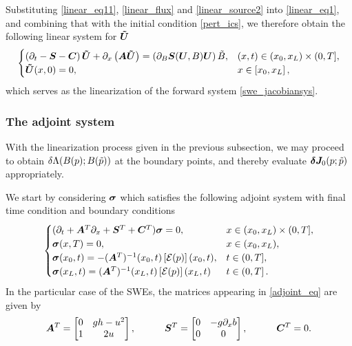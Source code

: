 Substituting \eqref{linear_eq11}, \eqref{linear_flux} and \eqref{linear_source2} into
\eqref{linear_eq1}, and combining that with the initial condition \eqref{pert_ics}, we therefore obtain the following linear system for $\bm{\tilde{U}}$
\begin{equation} \label{linear_eq2}
    \begin{cases}
    \left(\partial_t - \bm{S} -\bm{C} \right) \bm{\tilde{U}} +\partial_x\left(\bm{A}\bm{\tilde{U}}\right) = \left(\partial_{B}\bm{S}(\bm{U},B)\bm{U}\right){\tilde{B}},  & (x,t) \in (x_0,x_L) \times (0,T], \\
    \bm{\tilde{U}}(x,0) = 0, & x \in [x_0,x_L] \,, \\
    \end{cases}
\end{equation}
which serves as the linearization of the forward system \eqref{swe_jacobiansys}.


\subsubsection{The adjoint system}

With the linearization process given in the previous subsection, we may proceed to obtain $\delta\Lambda (B(p);B(\tilde{p}))$ at the boundary points, and thereby evaluate $\bm{\delta J}_0 (p;\tilde{p})$ appropriately.

We start by considering $\bm{\sigma}$ which satisfies the following adjoint system with final time condition and boundary conditions
\begin{equation} \label{adjoint_eq}
    \begin{cases}
    (\partial_t+ \bm{A}^T\partial_x + \bm{S}^T +\bm{C}^T)\bm{\sigma} = 0, & x\in (x_0,x_L) \times (0,T], \\
    \bm{\sigma}(x,T) = 0, & x\in (x_0,x_L), \\
    \bm{\sigma}(x_0,t) = -(\bm{A}^T)^{-1}(x_0,t)\left[\mathcal{E}(p)\right](x_0,t), & t \in (0,T], \\
    \bm{\sigma}(x_L,t) = (\bm{A}^T)^{-1}(x_L,t)\left[\mathcal{E}(p)\right](x_L,t) & t \in (0,T]\,. \\ 
    \end{cases}
\end{equation}
In the particular case of the SWEs, the matrices appearing in \eqref{adjoint_eq} are given by
\begin{equation}
    \bm{A}^T = \begin{bmatrix}0 & gh-u^2 \\ 1 & 2u\end{bmatrix},
    \quad\quad\quad 
    \bm{S}^T = \begin{bmatrix}0 & -g\partial_x b \\ 0 & 0\end{bmatrix},
    \quad\quad\quad 
    \bm{C}^T = 0.
\end{equation}


